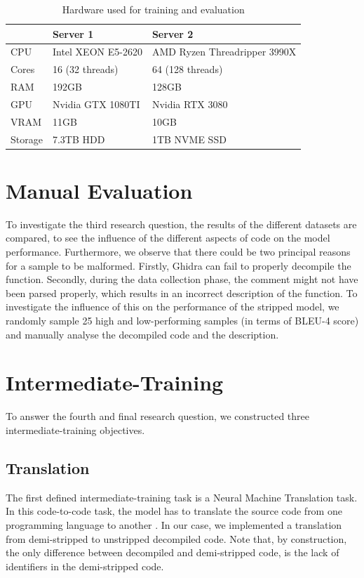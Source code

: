\label{tab:server}
\begin{table}[!h]
\centering
\begin{tabular}{l|ll}
\hline
        & Server 1           & Server 2                     \\ \hline
CPU     & Intel XEON E5-2620 & AMD Ryzen Threadripper 3990X \\
Cores   & 16 (32 threads)    & 64 (128 threads)             \\
RAM     & 192GB              & 128GB                        \\
GPU     & Nvidia GTX 1080TI  & Nvidia RTX 3080              \\
VRAM    & 11GB               & 10GB                         \\
Storage & 7.3TB HDD          & 1TB NVME SSD                
\end{tabular}
\caption{Hardware used for training and evaluation}
\end{table}

\section{Manual Evaluation}
To investigate the third research question, the results of the different datasets are compared, to see the influence of the different aspects of code on the model performance. Furthermore, we observe that there could be two principal reasons for a sample to be malformed. Firstly, Ghidra can fail to properly decompile the function. Secondly, during the data collection phase, the comment might not have been parsed properly, which results in an incorrect description of the function. To investigate the influence of this on the performance of the stripped model, we randomly sample 25 high and low-performing samples (in terms of BLEU-4 score) and manually analyse the decompiled code and the description. 

\section{Intermediate-Training}

To answer the fourth and final research question, we constructed three intermediate-training objectives.

\subsection{Translation}
The first defined intermediate-training task is a Neural Machine Translation task. In this code-to-code task, the model has to translate the source code from one programming language to another \cite{CodeXGlue}. 
In our case, we implemented a translation from demi-stripped to unstripped decompiled code. Note that, by construction, the only difference between decompiled and demi-stripped code, is the lack of identifiers in the demi-stripped code.


